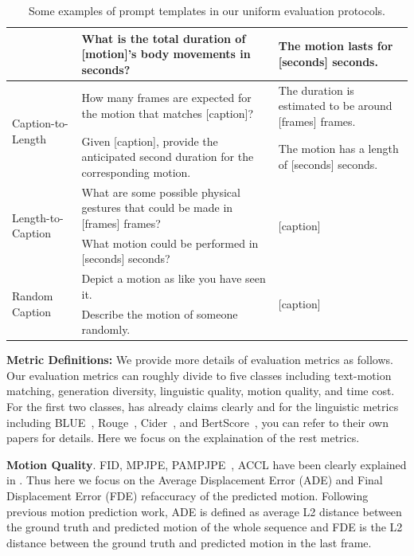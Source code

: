 \begin{table}[H]
{\begin{tabular}{@{}lll@{}}
\\ & What is the total duration of  [motion]'s body movements in seconds? & The motion lasts for [seconds] seconds.
\\ \midrule \multirow{2}{*}{Caption-to-Length}&How many frames are expected for the motion that matches [caption]?& The duration is estimated to be around [frames] frames.
\\ & Given [caption], provide the anticipated second duration for the corresponding motion. & The motion has a length of [seconds] seconds.
\\ \midrule \multirow{2}{*}{Length-to-Caption}&What are some possible physical gestures that could be made in [frames] frames?&\multirow{2}{*}{[caption] }
\\ & What motion could be performed in [seconds] seconds? &
\\ \midrule \multirow{2}{*}{Random Caption}&Depict a motion as like you have seen it.&\multirow{2}{*}{[caption] }
\\ & Describe the motion of someone randomly.&
\\ \bottomrule
\end{tabular}%
}
\vspace{10pt}
\caption{Some examples of prompt templates in our uniform evaluation protocols.}
\label{tab:appendix:prompts}
\end{table}


\label{appedix:metrics:details}


\textbf{Metric Definitions:} We provide more details of evaluation metrics as follows. Our evaluation metrics can roughly divide to five classes including text-motion matching, generation diversity, linguistic quality, motion quality, and time cost. For the first two classes, \cite{chen2023mld} has already claims clearly and for the linguistic metrics including BLUE~\cite{papineni2002bleu}, Rouge~\cite{lin2004rouge}, Cider~\cite{vedantam2015cider}, and BertScore~\cite{zhang2019bertscore}, you can refer to their own papers for details. Here we focus on the explaination of the rest metrics.


\textbf{Motion Quality}. 
FID, MPJPE, PAMPJPE~\cite{gower1975generalized}, ACCL have been clearly explained in \cite{chen2023mld}. Thus here we focus on the  Average Displacement Error (ADE) and Final Displacement Error (FDE) refaccuracy of the predicted motion. Following previous motion prediction work\cite{yuan2020dlow, zhang2021we, ma2022multi}, ADE is defined as average L2 distance between the ground truth and predicted motion of the whole sequence and FDE is the L2 distance between the ground truth and predicted motion in the last frame.

